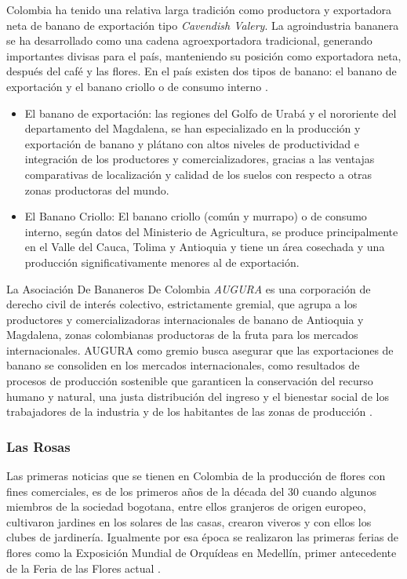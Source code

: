 \begin{spacing}{1.5}
Colombia ha tenido una relativa larga tradición como productora y exportadora neta de banano de exportación tipo \emph{Cavendish Valery}. La agroindustria bananera se ha desarrollado como una cadena agroexportadora tradicional, generando importantes divisas para el país, manteniendo su posición como exportadora neta, después del café y las flores. En el país existen dos tipos de banano: el banano de exportación y el banano criollo o de consumo interno \cite{bananoFINAGRO}.

\begin{itemize}
\item El banano de exportación: las regiones del Golfo de Urabá y el nororiente del departamento del Magdalena, se han especializado en la producción y exportación de banano y plátano con altos niveles de productividad e integración de los productores y comercializadores, gracias a las ventajas comparativas de localización y calidad de los suelos con respecto a otras zonas productoras del mundo.
\item El Banano Criollo: El banano criollo (común y murrapo) o de consumo interno, según datos del Ministerio de Agricultura, se produce principalmente en el Valle del Cauca, Tolima y Antioquia y tiene un área cosechada y una producción significativamente menores al de exportación.
\end{itemize}

La Asociación De Bananeros De Colombia \emph{AUGURA} es una corporación de derecho civil de interés colectivo, estrictamente gremial, que agrupa a los productores y comercializadoras internacionales de banano de Antioquia y Magdalena, zonas colombianas productoras de la fruta para los mercados internacionales. AUGURA como gremio busca asegurar que las exportaciones de banano se consoliden en los mercados internacionales, como resultados de procesos de producción sostenible que garanticen la conservación del recurso humano y natural, una justa distribución del ingreso y el bienestar social de los trabajadores de la industria y de los habitantes de las zonas de producción \cite{bananoAUGURA}.

\subsubsection{Las Rosas}
Las primeras noticias que se tienen en Colombia de la producción de flores con  fines comerciales, es de los primeros años de la década del 30 cuando algunos miembros de la sociedad bogotana, entre ellos granjeros de origen europeo, cultivaron jardines en los solares de las casas, crearon viveros y con ellos  los clubes de jardinería. Igualmente por esa época se realizaron las primeras  ferias de flores como la Exposición Mundial de Orquídeas en Medellín, primer antecedente de la Feria de las Flores actual \cite{cardenasRodriguez}.


\end{spacing}
